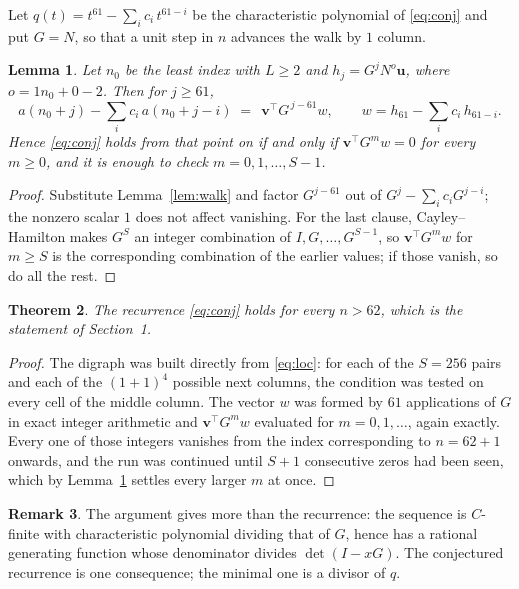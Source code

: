 \documentclass[11pt,a4paper]{article}
\theoremstyle{plain}
\newtheorem{theorem}{Theorem}
\newtheorem{lemma}[theorem]{Lemma}
\theoremstyle{definition}
\newtheorem{remark}[theorem]{Remark}
\begin{document}
Let $q(t)=t^{61}-\sum_i c_i\,t^{61-i}$ be the characteristic polynomial of
\eqref{eq:conj} and put $G=N$, so that a unit step in $n$ advances the walk by
$1$ column.

\begin{lemma}\label{lem:crit}
Let $n_0$ be the least index with $L\ge2$ and $h_j=G^{j}N^{o}\mathbf{u}$, where
$o=1n_0+0-2$. Then for $j\ge61$,
\[
a(n_0+j)-\sum_i c_i\,a(n_0+j-i)\;=\;\,\mathbf{v}^{\!\top}G^{\,j-61}w,
\qquad w=h_{61}-\sum_i c_i\,h_{61-i} .
\]
Hence \eqref{eq:conj} holds from that point on if and only if
$\mathbf{v}^{\!\top}G^{m}w=0$ for every $m\ge0$, and it is enough to check
$m=0,1,\dots,S-1$.
\end{lemma}

\begin{proof}
Substitute Lemma~\ref{lem:walk} and factor $G^{j-61}$ out of
$G^{j}-\sum_ic_iG^{j-i}$; the nonzero scalar $1$ does not affect
vanishing. For the last clause, Cayley--Hamilton makes $G^{S}$ an integer combination of
$I,G,\dots,G^{S-1}$, so $\mathbf{v}^{\!\top}G^{m}w$ for $m\ge S$ is the corresponding
combination of the earlier values; if those vanish, so do all the rest.
\end{proof}

\begin{theorem}
The recurrence \eqref{eq:conj} holds for every $n>62$, which is the statement of
Section~1.
\end{theorem}

\begin{proof}
The digraph was built directly from \eqref{eq:loc}: for each of the $S=256$ pairs and each
of the $(1+1)^{4}$ possible next columns, the condition was tested on every cell of
the middle column. The vector $w$ was formed by $61$ applications of $G$ in exact integer
arithmetic and $\mathbf{v}^{\!\top}G^{m}w$ evaluated for $m=0,1,\dots$, again exactly.
Every one of those integers vanishes from the index corresponding to $n=62+1$ onwards,
and the run was continued until $S+1$ consecutive zeros had been seen, which by
Lemma~\ref{lem:crit} settles every larger $m$ at once.
\end{proof}

\begin{remark}
The argument gives more than the recurrence: the sequence is $C$-finite with characteristic
polynomial dividing that of $G$, hence has a rational generating function whose denominator
divides $\det(I-xG)$. The conjectured recurrence is one consequence; the minimal one is a
divisor of $q$.
\end{remark}
\end{document}
